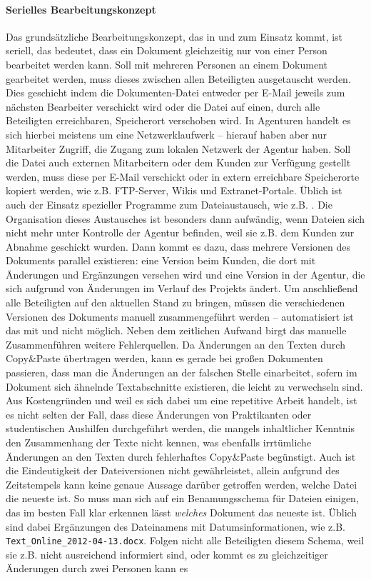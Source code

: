 \bigskip

\label{p:serielles-konzept}\paragraph{Serielles Bearbeitungskonzept} Das grundsätzliche Bearbeitungskonzept, das in  und  zum Einsatz kommt, ist seriell, das bedeutet, dass ein Dokument gleichzeitig nur von einer Person bearbeitet werden kann. Soll mit mehreren Personen an einem Dokument gearbeitet werden, muss dieses zwischen allen Beteiligten ausgetauscht werden. Dies geschieht indem die Dokumenten-Datei entweder per E-Mail jeweils zum nächsten Bearbeiter verschickt wird oder die Datei auf einen, durch alle Beteiligten erreichbaren, Speicherort verschoben wird. In Agenturen handelt es sich hierbei meistens um eine Netzwerklaufwerk -- hierauf haben aber nur Mitarbeiter Zugriff, die Zugang zum lokalen Netzwerk der Agentur haben. Soll die Datei auch externen Mitarbeitern oder dem Kunden zur Verfügung gestellt werden, muss diese per E-Mail verschickt oder in extern erreichbare Speicherorte kopiert werden, wie z.B. FTP-Server, Wikis und Extranet-Portale. Üblich ist auch der Einsatz spezieller Programme zum Dateiaustausch, wie z.B. . Die Organisation dieses Austausches ist besonders dann aufwändig, wenn Dateien sich nicht mehr unter Kontrolle der Agentur befinden, weil sie z.B. dem Kunden zur Abnahme geschickt wurden. Dann kommt es dazu, dass mehrere Versionen des Dokuments parallel existieren: eine Version beim Kunden, die dort mit Änderungen und Ergänzungen versehen wird und eine Version in der Agentur, die sich aufgrund von Änderungen im Verlauf des Projekts ändert. Um anschließend alle Beteiligten auf den aktuellen Stand zu bringen, müssen die verschiedenen Versionen des Dokuments manuell zusammengeführt werden -- automatisiert ist das mit  und  nicht möglich. Neben dem zeitlichen Aufwand birgt das manuelle Zusammenführen weitere Fehlerquellen. Da Änderungen an den Texten durch Copy\&Paste übertragen werden, kann es gerade bei großen Dokumenten passieren, dass man die Änderungen an der falschen Stelle einarbeitet, sofern im Dokument sich ähnelnde Textabschnitte existieren, die leicht zu verwechseln sind. Aus Kostengründen und weil es sich dabei um eine repetitive Arbeit handelt, ist es nicht selten der Fall, dass diese Änderungen von Praktikanten oder studentischen Aushilfen durchgeführt werden, die mangels inhaltlicher Kenntnis den Zusammenhang der Texte nicht kennen, was ebenfalls irrtümliche Änderungen an den Texten durch fehlerhaftes Copy\&Paste begünstigt. Auch ist die Eindeutigkeit der Dateiversionen nicht gewährleistet, allein aufgrund des Zeitstempels kann keine genaue Aussage darüber getroffen werden, welche Datei die neueste ist. So muss man sich auf ein Benamungsschema für Dateien einigen, das im besten Fall klar erkennen lässt \emph{welches} Dokument das neueste ist. Üblich sind dabei Ergänzungen des Dateinamens mit Datumsinformationen, wie z.B. \texttt{Text\_Online\_2012-04-13.docx}. Folgen nicht alle Beteiligten diesem Schema, weil sie z.B. nicht ausreichend informiert sind, oder kommt es zu gleichzeitiger Änderungen durch zwei Personen kann es 